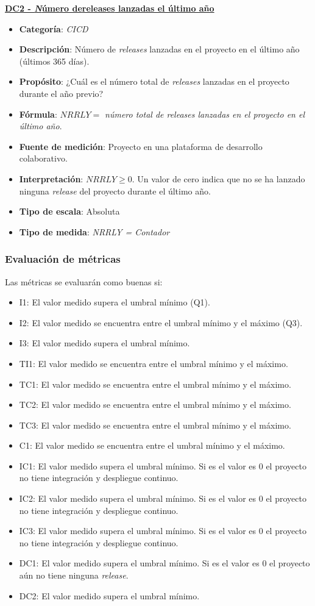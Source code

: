 \textbf{\underline{DC2 - \textit Número de{releases} lanzadas el último año}}
\begin{itemize}
	\item \textbf{Categoría}: \textit{CICD}
	\item \textbf{Descripción}: Número de \textit{releases} lanzadas en el proyecto en el último año (últimos 365 días).
	\item \textbf{Propósito}: ¿Cuál es el número total de \textit{releases} lanzadas en el proyecto durante el año previo?
	\item \textbf{Fórmula}: $NRRLY =$ \textit{número total de releases lanzadas en el proyecto en el último año}.
	\item \textbf{Fuente de medición}: Proyecto en una plataforma de desarrollo colaborativo.
	\item \textbf{Interpretación}: $NRRLY \geq 0$. Un valor de cero indica que no se ha lanzado ninguna \textit{release} del proyecto durante el último año.
	\item \textbf{Tipo de escala}: Absoluta
	\item \textbf{Tipo de medida}: \textit{NRRLY = Contador}
\end{itemize}

\subsubsection{Evaluación de métricas}\label{sect:B_5_1_2}
Las métricas se evaluarán como buenas si:
\begin{itemize}
	\item I1: El valor medido supera el umbral mínimo (Q1).
	\item I2: El valor medido se encuentra entre el umbral mínimo y el máximo (Q3).
	\item I3: El valor medido supera el umbral mínimo.
	\item TI1: El valor medido se encuentra entre el umbral mínimo y el máximo.
	\item TC1: El valor medido se encuentra entre el umbral mínimo y el máximo.
	\item TC2: El valor medido se encuentra entre el umbral mínimo y el máximo.
	\item TC3: El valor medido se encuentra entre el umbral mínimo y el máximo.
	\item C1: El valor medido se encuentra entre el umbral mínimo y el máximo.
	\item IC1: El valor medido supera el umbral mínimo. Si es el valor es 0 el proyecto no tiene integración y despliegue continuo.
	\item IC2: El valor medido supera el umbral mínimo. Si es el valor es 0 el proyecto no tiene integración y despliegue continuo.
	\item IC3: El valor medido supera el umbral mínimo. Si es el valor es 0 el proyecto no tiene integración y despliegue continuo.
	\item DC1: El valor medido supera el umbral mínimo. Si es el valor es 0 el proyecto aún no tiene ninguna \textit{release}.
	\item DC2: El valor medido supera el umbral mínimo.
\end{itemize}

